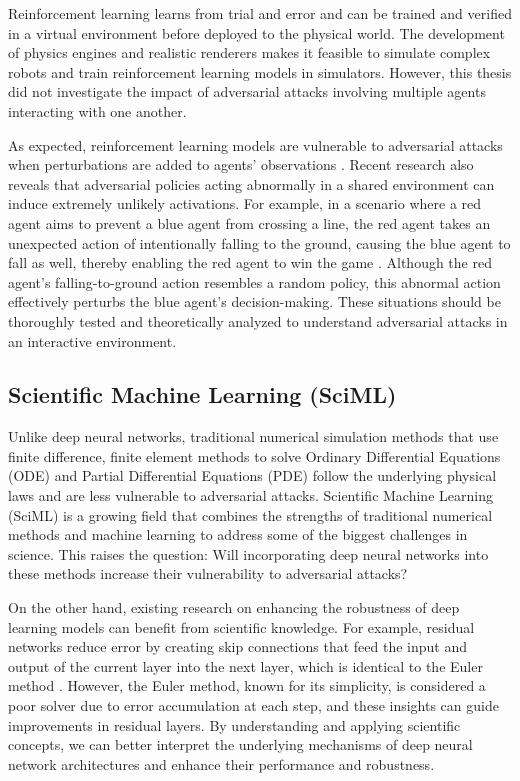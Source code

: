 Reinforcement learning learns from trial and error and can be trained and verified in a virtual environment before deployed to the physical world. The development of physics engines and realistic renderers makes it feasible to simulate complex robots and train reinforcement learning models in simulators. However, this thesis did not investigate the impact of adversarial attacks involving multiple agents interacting with one another.

As expected, reinforcement learning models are vulnerable to adversarial attacks when perturbations are added to agents' observations \citep{chen2019adversarial}. Recent research also reveals that adversarial policies acting abnormally in a shared environment can induce extremely unlikely activations. For example, in a scenario where a red agent aims to prevent a blue agent from crossing a line, the red agent takes an unexpected action of intentionally falling to the ground, causing the blue agent to fall as well, thereby enabling the red agent to win the game \citep{gleave2021adversarial}. Although the red agent's falling-to-ground action resembles a random policy, this abnormal action effectively perturbs the blue agent's decision-making. These situations should be thoroughly tested and theoretically analyzed to understand adversarial attacks in an interactive environment.

\subsection{Scientific Machine Learning (SciML)}

Unlike deep neural networks, traditional numerical simulation methods that use finite difference, finite element methods to solve Ordinary Differential Equations (ODE) and Partial Differential Equations (PDE) follow the underlying physical laws and are less vulnerable to adversarial attacks. Scientific Machine Learning (SciML) is a growing field that combines the strengths of traditional numerical methods and machine learning to address some of the biggest challenges in science. This raises the question: Will incorporating deep neural networks into these methods increase their vulnerability to adversarial attacks? 


On the other hand, existing research on enhancing the robustness of deep learning models can benefit from scientific knowledge. For example, residual networks reduce error by creating skip connections that feed the input and output of the current layer into the next layer, which is identical to the Euler method \citep{chen2018neural}. However, the Euler method, known for its simplicity, is considered a poor solver due to error accumulation at each step, and these insights can guide improvements in residual layers. By understanding and applying scientific concepts, we can better interpret the underlying mechanisms of deep neural network architectures and enhance their performance and robustness.
